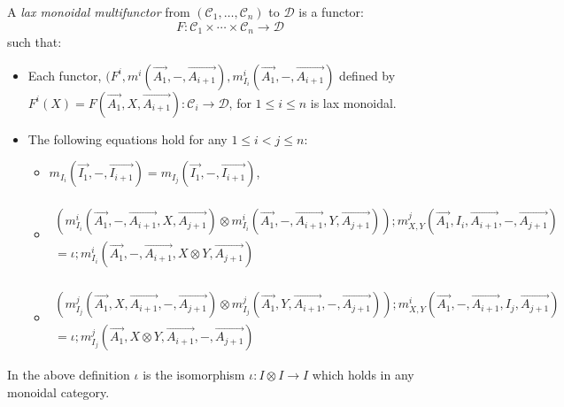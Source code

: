 \newcommand{\cat}[1]{\mathcal{#1}}
\newcommand{\mto}{\to}

\begin{definition}
  \label{def:lax-monoidal-multifunctors}
  A \emph{lax monoidal multifunctor} from $(\cat{C}_1,\ldots,\cat{C}_n)$ to $\cat{D}$ is a functor:
  \[
  F : \cat{C}_1 \times \cdots \times \cat{C}_n \mto \cat{D}
  \]
  such that:
  \begin{itemize}
  \item Each functor,
    $(F^i, m^i(\overrightarrow{A_1},-,\overrightarrow{A_{i+1}}), m^i_{I_i}(\overrightarrow{A_1},-,\overrightarrow{A_{i+1}})$
    defined by
    $F^i(X) = F(\overrightarrow{A_1},X,\overrightarrow{A_{i+1}}) : \cat{C}_i \mto \cat{D}$,
    for $1 \leq i \leq n$ is lax monoidal.
  \item The following equations hold for any $1 \leq i < j \leq n$:
    \begin{itemize}
    \item $m_{I_i}(\overrightarrow{I_1},-,\overrightarrow{I_{i+1}}) = m_{I_j}(\overrightarrow{I_1},-,\overrightarrow{I_{i+1}})$,
    \item
      \begin{math}
        \begin{array}{lll}
          \\
          (m^i_{I_i}(\overrightarrow{A_1},-,\overrightarrow{A_{i+1}},X,\overrightarrow{A_{j+1}}) \otimes m^i_{I_i}(\overrightarrow{A_1},-,\overrightarrow{A_{i+1}},Y,\overrightarrow{A_{j+1}}));m^j_{X,Y}(\overrightarrow{A_1},I_i,\overrightarrow{A_{i+1}},-,\overrightarrow{A_{j+1}}) \\ = \iota;m^{i}_{I_i}(\overrightarrow{A_1},-,\overrightarrow{A_{i+1}},X \otimes Y,\overrightarrow{A_{j+1}})
        \end{array}
      \end{math}

    \item \begin{math}
        \begin{array}{lll}
          \\
          (m^j_{I_j}(\overrightarrow{A_1},X,\overrightarrow{A_{i+1}},-,\overrightarrow{A_{j+1}}) \otimes m^j_{I_j}(\overrightarrow{A_1},Y,\overrightarrow{A_{i+1}},-,\overrightarrow{A_{j+1}}));m^i_{X,Y}(\overrightarrow{A_1},-,\overrightarrow{A_{i+1}},I_j,\overrightarrow{A_{j+1}}) \\ = \iota;m^{j}_{I_j}(\overrightarrow{A_1},X \otimes Y,\overrightarrow{A_{i+1}},-,\overrightarrow{A_{j+1}})
        \end{array}
    \end{math}
    \end{itemize}    
  \end{itemize}
\end{definition}
\noindent
In the above definition $\iota$ is the isomorphism $\iota : I \otimes I \mto I$ which holds in any monoidal category.


